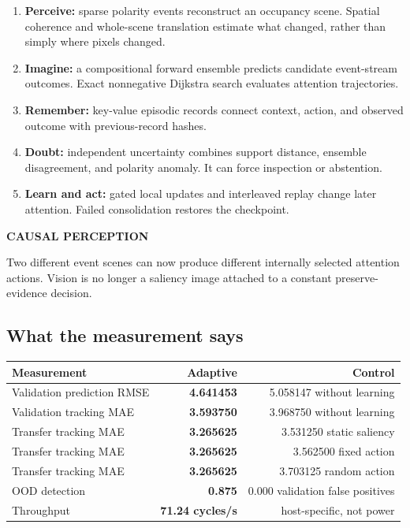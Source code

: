 \documentclass[11pt]{article}
\newcommand{\card}[2]{\colorbox{ZoeLight}{\parbox{0.94\textwidth}{\small\textbf{\color{ZoeCyan!50!black}#1}\par\smallskip #2\par}}}
\begin{document}
\begin{enumerate}
  \item \textbf{Perceive:} sparse polarity events reconstruct an occupancy scene. Spatial coherence and whole-scene translation estimate what changed, rather than simply where pixels changed.
  \item \textbf{Imagine:} a compositional forward ensemble predicts candidate event-stream outcomes. Exact nonnegative Dijkstra search evaluates attention trajectories.
  \item \textbf{Remember:} key-value episodic records connect context, action, and observed outcome with previous-record hashes.
  \item \textbf{Doubt:} independent uncertainty combines support distance, ensemble disagreement, and polarity anomaly. It can force inspection or abstention.
  \item \textbf{Learn and act:} gated local updates and interleaved replay change later attention. Failed consolidation restores the checkpoint.
\end{enumerate}

\card{CAUSAL PERCEPTION}{Two different event scenes can now produce different internally selected attention actions. Vision is no longer a saliency image attached to a constant preserve-evidence decision.}

\subsection{What the measurement says}

\begin{center}
\begin{tabular}{lrr}
\toprule
\textbf{Measurement} & \textbf{Adaptive} & \textbf{Control}\\
\midrule
Validation prediction RMSE & \textbf{4.641453} & 5.058147 without learning\\
Validation tracking MAE & \textbf{3.593750} & 3.968750 without learning\\
Transfer tracking MAE & \textbf{3.265625} & 3.531250 static saliency\\
Transfer tracking MAE & \textbf{3.265625} & 3.562500 fixed action\\
Transfer tracking MAE & \textbf{3.265625} & 3.703125 random action\\
OOD detection & \textbf{0.875} & 0.000 validation false positives\\
Throughput & \textbf{71.24 cycles/s} & host-specific, not power\\
\bottomrule
\end{tabular}
\end{center}
\end{document}
